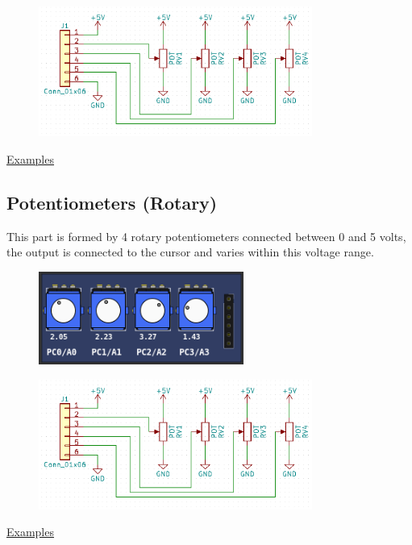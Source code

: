 \begin{figure}[H]
\center
\includegraphics[width=0.8\textwidth]{img/part_pot_.png} 
\end{figure} 

\href{https://lcgamboa.github.io/picsimlab_examples/parts_Potentiometers.html}{Examples}

\subsection{Potentiometers (Rotary)}

This part is formed by 4 rotary potentiometers connected between 0 and 5 volts, the output is connected to the cursor and varies within this voltage range.
\begin{figure}[H]
\center
\includegraphics[width=0.6\textwidth]{img/part_pot_r.png} 
\end{figure} 

\begin{figure}[H]
\center
\includegraphics[width=0.8\textwidth]{img/part_pot_.png} 
\end{figure} 

\href{https://lcgamboa.github.io/picsimlab_examples/parts_Potentiometers_(Rotary).html}{Examples}


